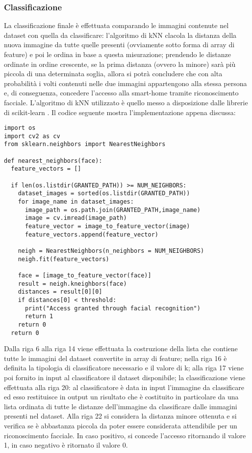 \subsubsection{Classificazione}
La classificazione finale è effettuata comparando le immagini contenute nel dataset con quella da classificare: l'algoritmo di kNN clacola la distanza della nuova immagine da tutte quelle presenti (ovviamente sotto forma di array di feature) e poi le ordina in base a questa misurazione; prendendo le distanze ordinate in ordine crescente, se la prima distanza (ovvero la minore) sarà più piccola di una determinata soglia, allora si potrà concludere che con alta probabilità i volti contenuti nelle due immagini appartengono alla stessa persona e, di conseguenza, concedere l'accesso alla smart-home tramite riconoscimento facciale. L'algoritmo di kNN utilizzato è quello messo a disposizione dalle librerie di scikit-learn \cite{scikit-learn}. Il codice seguente mostra l'implementazione appena discussa:
\begin{lstlisting}
import os
import cv2 as cv
from sklearn.neighbors import NearestNeighbors

def nearest_neighbors(face):
  feature_vectors = []

  if len(os.listdir(GRANTED_PATH)) >= NUM_NEIGHBORS:
    dataset_images = sorted(os.listdir(GRANTED_PATH))
    for image_name in dataset_images:
      image_path = os.path.join(GRANTED_PATH,image_name)
      image = cv.imread(image_path)
      feature_vector = image_to_feature_vector(image)
      feature_vectors.append(feature_vector)

    neigh = NearestNeighbors(n_neighbors = NUM_NEIGHBORS)
    neigh.fit(feature_vectors)

    face = [image_to_feature_vector(face)]
    result = neigh.kneighbors(face)
    distances = result[0][0]
    if distances[0] < threshold:
      print("Access granted through facial recognition")
      return 1
    return 0
  return 0
\end{lstlisting}
Dalla riga 6 alla riga 14 viene effettuata la costruzione della lista che contiene tutte le immagini del dataset convertite in array di feature; nella riga 16 è definita la tipologia di classificatore necessario e il valore di k; alla riga 17 viene poi fornito in input al classificatore il dataset disponibile; la classificazione viene effettuata alla riga 20: al classificatore è data in input l'immagine da classificare ed esso restituisce in output un risultato che è costituito in particolare da una lista ordinata di tutte le distanze dell'immagine da classificare dalle immagini presenti nel dataset. Alla riga 22 si considera la distanza minore ottenuta e si verifica se è abbastanza piccola da poter essere considerata attendibile per un riconoscimento facciale. In caso positivo, si concede l'accesso ritornando il valore 1, in caso negativo è ritornato il valore 0.

